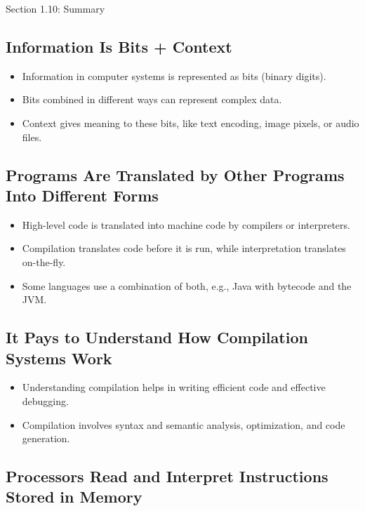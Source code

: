 \begin{notes}{Section 1.10: Summary}
    \subsection*{Information Is Bits + Context}

    \begin{itemize}
        \item Information in computer systems is represented as bits (binary digits).
        \item Bits combined in different ways can represent complex data.
        \item Context gives meaning to these bits, like text encoding, image pixels, or audio files.
    \end{itemize}
    
    \subsection*{Programs Are Translated by Other Programs Into Different Forms}
    
    \begin{itemize}
        \item High-level code is translated into machine code by compilers or interpreters.
        \item Compilation translates code before it is run, while interpretation translates on-the-fly.
        \item Some languages use a combination of both, e.g., Java with bytecode and the JVM.
    \end{itemize}
    
    \subsection*{It Pays to Understand How Compilation Systems Work}
    
    \begin{itemize}
        \item Understanding compilation helps in writing efficient code and effective debugging.
        \item Compilation involves syntax and semantic analysis, optimization, and code generation.
    \end{itemize}
    
    \subsection*{Processors Read and Interpret Instructions Stored in Memory}
    

\end{notes}
